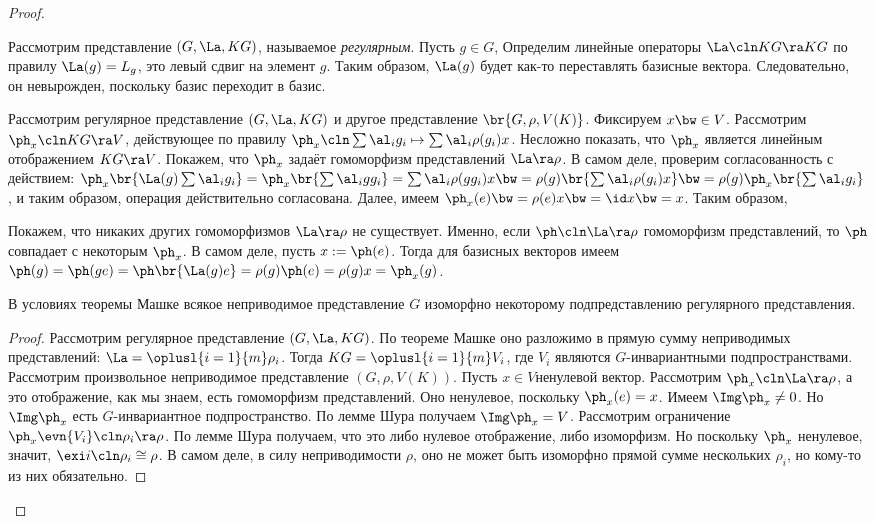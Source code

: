 \documentclass[a4paper]{article}
\begin{document}
\begin{proof}
\begin{df}
Рассмотрим представление $(G, \La, KG)$, называемое \emph{регулярным}.  Пусть $g \in G$, Определим линейные
операторы $\La\cln KG \ra KG$ по правилу $\La(g) = L_g$,  это левый сдвиг на элемент $g$. Таким образом,
$\La(g)$ будет как-то переставлять базисные вектора. Следовательно, он невырожден, поскольку базис переходит
в базис.
\end{df}

Рассмотрим регулярное представление $(G, \La, KG)$ и другое представление  $\br{G, \rho, V(K)}$. Фиксируем
$x \bw\in V$. Рассмотрим $\ph_x\cln KG \ra V$, действующее по правилу $\ph_x \cln \sum \al_ig_i \mapsto \sum \al_i
\rho(g_i)x$. Несложно показать, что $\ph_x$ является линейным отображением $KG \ra V$. Покажем, что $\ph_x$
задаёт гомоморфизм представлений $\La \ra \rho$. В самом деле, проверим согласованность с действием:
$\ph_x\br{\La(g)\sum \al_i g_i} = \ph_x \br{\sum \al_i gg_i}= \sum \al_i \rho(gg_i)x \bw= \rho(g)\br{\sum \al_i
\rho(g_i)x} \bw= \rho(g) \ph_x\br{\sum \al_ig_i}$, и таким образом, операция действительно согласована. Далее,
имеем $\ph_x(e)\bw=\rho(e)x\bw= \id x \bw= x$. Таким образом,

Покажем, что никаких других гомоморфизмов $\La \ra \rho$ не существует.  Именно, если $\ph\cln \La \ra \rho$\т
гомоморфизм представлений, то $\ph$ совпадает с некоторым $\ph_x$. В самом деле, пусть $x := \ph(e)$. Тогда
для базисных векторов имеем $\ph(g)=\ph(ge)=\ph\br{\La(g)e}=\rho(g)\ph(e)=\rho(g)x=\ph_x(g)$.

\begin{theorem}
В условиях теоремы Машке всякое неприводимое представление $G$ изоморфно
некоторому подпредставлению регулярного представления.
\end{theorem}
\begin{proof}
Рассмотрим регулярное представление $(G, \La, KG)$. По теореме Машке оно  разложимо в прямую сумму
неприводимых представлений: $\La = \oplusl{i=1}{m}\rho_i$. Тогда $KG = \oplusl{i=1}{m}V_i$, где $V_i$
являются $G$-инвариантными подпространствами. Рассмотрим произвольное неприводимое представление $(G, \rho,
V(K))$. Пусть $x \in V$\т ненулевой вектор. Рассмотрим $\ph_x\cln \La \ra \rho$, а это отображение, как мы
знаем, есть гомоморфизм представлений. Оно ненулевое, поскольку $\ph_x(e)=x$. Имеем $\Img \ph_x \neq 0$. Но
$\Img \ph_x$ есть $G$-инвариантное подпространство. По лемме Шура получаем $\Img \ph_x = V$. Рассмотрим
ограничение $\ph_x\evn{V_i}\cln \rho_i \ra \rho$. По лемме Шура получаем, что это либо нулевое отображение,
либо изоморфизм. Но поскольку $\ph_x$ ненулевое, значит, $\exi i\cln \rho_i \cong \rho$. В самом деле, в силу
неприводимости $\rho$, оно не может быть изоморфно прямой сумме нескольких $\rho_i$, но кому-то из них\т
обязательно.
\end{proof}


\end{proof}
\end{document}

